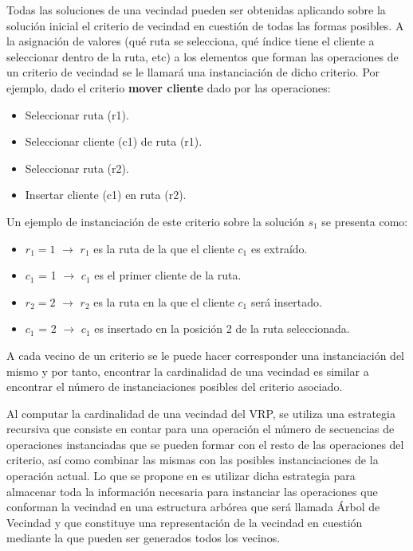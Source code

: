 Todas las soluciones de una vecindad pueden ser obtenidas aplicando sobre la solución inicial el criterio de vecindad en cuestión de todas las formas posibles. A la asignación de valores (qué ruta se selecciona, qué índice tiene el cliente a seleccionar dentro de la ruta, etc) a los elementos que forman las operaciones de un criterio de vecindad se le llamará una instanciación de dicho criterio. Por ejemplo, dado el criterio \textbf{mover cliente} dado por las operaciones: 

\begin{itemize}
	\item Seleccionar ruta (r1).
	\item Seleccionar cliente (c1) de ruta (r1).
	\item Seleccionar ruta (r2).
	\item Insertar cliente (c1) en ruta (r2).
\end{itemize}

Un ejemplo de instanciación de este criterio sobre la solución $s_1$ se presenta como:

\begin{itemize}
	\item $r_1 = 1$ $\rightarrow$ $r_1$ es la ruta de la que el cliente $c_1$ es extraído.
	\item $c_1$ = 1 $\rightarrow$ $c_1$ es el primer cliente de la ruta.
	\item $r_2 = 2$ $\rightarrow$ $r_2$ es la ruta en la que el cliente $c_1$ será insertado.
	\item $c_1$ = 2 $\rightarrow$ $c_1$ es insertado en la posición 2 de la ruta seleccionada.
\end{itemize}

A cada vecino de un criterio se le puede hacer corresponder una instanciación del mismo y por tanto, encontrar la cardinalidad de una vecindad es similar a encontrar el número de instanciaciones posibles del criterio asociado.

Al computar la cardinalidad de una vecindad del VRP, se utiliza una estrategia recursiva que consiste en contar para una operación el número de secuencias de operaciones instanciadas que se pueden formar con el resto de las operaciones del criterio, así como combinar las mismas con las posibles instanciaciones de la operación actual. Lo que se propone en \cite{Hector} es utilizar dicha estrategia para almacenar toda la información necesaria para instanciar las operaciones que conforman la vecindad en una estructura arbórea que será llamada Árbol de Vecindad y que constituye una representación de la vecindad en cuestión mediante la que pueden ser generados todos los vecinos.

